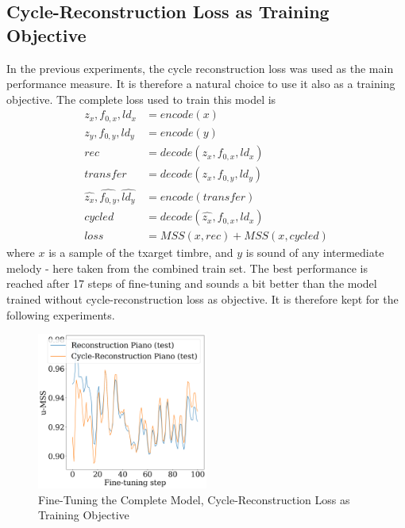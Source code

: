 \subsection{Cycle-Reconstruction Loss as Training Objective}
\label{fine-tune-cycle}
In the previous experiments, the cycle reconstruction loss was used as the main performance measure. It is therefore a natural choice to use it also as a training objective.
The complete loss used to train this model is
\begin{equation}
    \begin{split}
    z_x, f_{0,x}, ld_x &= encode(x) \\
    z_y, f_{0,y}, ld_y &= encode(y) \\
    rec &= decode(z_x, f_{0,x}, ld_x ) \\
    transfer &= decode(z_x, f_{0,y}, ld_y ) \\
    \hat{z_{x}}, \hat{f_{0,y}}, \hat{ld_y} &= encode(transfer) \\
    cycled &= decode(\hat{z_{x}}, f_{0,x}, ld_x ) \\
    loss &= MSS(x, rec) + MSS(x, cycled)
    \end{split}
\end{equation}
where $x$ is a sample of the txarget timbre, and $y$ is sound of any intermediate melody - here taken from the combined train set. The best performance is reached after 17 steps of fine-tuning and sounds a bit better than the model trained without cycle-reconstruction loss as objective. It is therefore kept for the following experiments.


\begin{figure}
    \centering
    \includegraphics[width=0.5\textwidth]{figures/fine-tuning/cycle-objective/metrics-over-step.png}
    \captionsetup{justification=centering,margin=2cm}
    \caption{Fine-Tuning the Complete Model, Cycle-Reconstruction Loss as Training Objective}
    \label{fig:cycle-loss-objective}
    
\end{figure}


